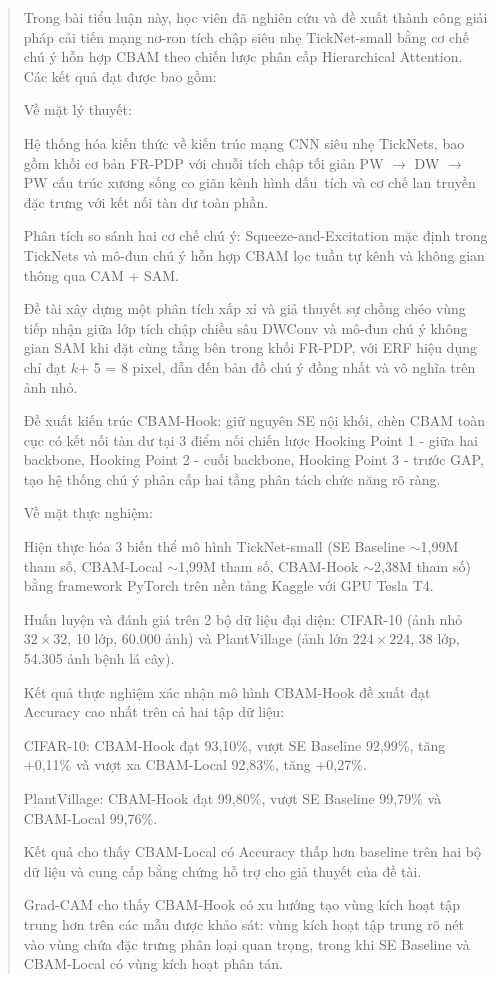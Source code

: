 \documentclass[
  12pt,
  a4paper,
]{report}
\begin{document}
\begin{quote}
Trong bài tiểu luận này, học viên đã nghiên cứu và đề xuất thành công
giải pháp cải tiến mạng nơ-ron tích chập siêu nhẹ TickNet-small bằng cơ
chế chú ý hỗn hợp CBAM theo chiến lược phân cấp Hierarchical Attention.
Các kết quả đạt được bao gồm:

Về mặt lý thuyết:

Hệ thống hóa kiến thức về kiến trúc mạng CNN siêu nhẹ TickNets, bao gồm
khối cơ bản FR-PDP với chuỗi tích chập tối giản PW \(\rightarrow\) DW
\(\rightarrow\) PW cấu trúc xương sống co giãn kênh hình dấu~tích và cơ
chế lan truyền đặc trưng với kết nối tàn dư toàn phần.

Phân tích so sánh hai cơ chế chú ý: Squeeze-and-Excitation mặc định
trong TickNets và mô-đun chú ý hỗn hợp CBAM lọc tuần tự kênh và không
gian thông qua CAM + SAM.

Đề tài xây dựng một phân tích xấp xỉ và giả thuyết sự chồng chéo vùng
tiếp nhận giữa lớp tích chập chiều sâu DWConv và mô-đun chú ý không gian
SAM khi đặt cùng tầng bên trong khối FR-PDP, với ERF hiệu dụng chỉ đạt
\(k\)+ 5 = 8 pixel, dẫn đến bản đồ chú ý đồng nhất và vô nghĩa trên ảnh
nhỏ.

Đề xuất kiến trúc CBAM-Hook: giữ nguyên SE nội khối, chèn CBAM toàn cục
có kết nối tàn dư tại 3 điểm nối chiến lược Hooking Point 1 - giữa hai
backbone, Hooking Point 2 - cuối backbone, Hooking Point 3 - trước GAP,
tạo hệ thống chú ý phân cấp hai tầng phân tách chức năng rõ ràng.

Về mặt thực nghiệm:

Hiện thực hóa 3 biến thể mô hình TickNet-small (SE Baseline
\(\sim\)1,99M tham số, CBAM-Local \(\sim\)1,99M tham số, CBAM-Hook
\(\sim\)2,38M tham số) bằng framework PyTorch trên nền tảng Kaggle với
GPU Tesla T4.

Huấn luyện và đánh giá trên 2 bộ dữ liệu đại diện: CIFAR-10 (ảnh nhỏ
\(32 \times 32\), 10 lớp, 60.000 ảnh) và PlantVillage (ảnh lớn
\(224 \times 224\), 38 lớp, 54.305 ảnh bệnh lá cây).

Kết quả thực nghiệm xác nhận mô hình CBAM-Hook đề xuất đạt Accuracy cao
nhất trên cả hai tập dữ liệu:

CIFAR-10: CBAM-Hook đạt 93,10\%, vượt SE Baseline 92,99\%, tăng +0,11\%
và vượt xa CBAM-Local 92,83\%, tăng +0,27\%.

PlantVillage: CBAM-Hook đạt 99,80\%, vượt SE Baseline 99,79\% và
CBAM-Local 99,76\%.

Kết quả cho thấy CBAM-Local có Accuracy thấp hơn baseline trên hai bộ dữ
liệu và cung cấp bằng chứng hỗ trợ cho giả thuyết của đề tài.

Grad-CAM cho thấy CBAM-Hook có xu hướng tạo vùng kích hoạt tập trung hơn
trên các mẫu được khảo sát: vùng kích hoạt tập trung rõ nét vào vùng
chứa đặc trưng phân loại quan trọng, trong khi SE Baseline và CBAM-Local
có vùng kích hoạt phân tán.
\end{quote}
\end{document}
